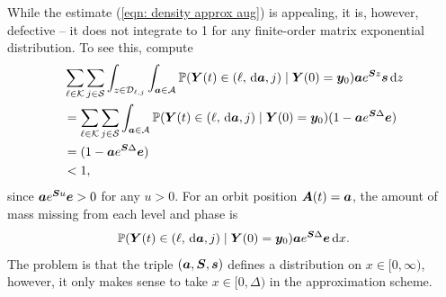 While the estimate (\ref{eqn: density approx aug}) is appealing, it is, however, defective -- it does not integrate to 1 for any finite-order matrix exponential distribution. To see this, compute 
\begin{align*}
	&\sum_{\ell\in\mathcal K}\sum_{j\in\mathcal S}\int_{z\in\mathcal D_{\ell,j}}\displaystyle\int_{\boldsymbol a \in\mathcal A}\mathbb P(\boldsymbol Y(t) \in{}(\ell, \, \mathrm{d} \boldsymbol a, j)\mid \boldsymbol Y(0)=\boldsymbol y_0) \boldsymbol a e^{ \boldsymbol{S}z} \boldsymbol s \, \mathrm{d} z
	\\&= \sum_{\ell\in\mathcal K}\sum_{j\in\mathcal S}\displaystyle\int_{\boldsymbol a \in\mathcal A}\mathbb P(\boldsymbol Y(t) \in{}(\ell, \, \mathrm{d} \boldsymbol a, j)\mid \boldsymbol Y(0)=\boldsymbol y_0) (1-\boldsymbol a e^{ \boldsymbol{S}\Delta}\boldsymbol e  )
	\\&=(1-\boldsymbol a e^{ \boldsymbol{S}\Delta}\boldsymbol e  )
	\\&<1,
\end{align*}
since \(\boldsymbol a e^{\boldsymbol{S}u} \boldsymbol e>0\) for any \(u>0\). For an orbit position \(\boldsymbol A(t)=\boldsymbol a\), the amount of mass missing from each level and phase is 
\[\mathbb P(\boldsymbol Y(t)\in{}(\ell, \, \mathrm{d} \boldsymbol a,j)\mid \boldsymbol Y(0)=\boldsymbol y_0) \boldsymbol a e^{\boldsymbol{S}\Delta} \boldsymbol e \, \mathrm{d} x.\]
The problem is that the triple \((\boldsymbol a,\boldsymbol S, \boldsymbol s)\) defines a distribution on \(x\in{}[0,\infty)\), however, it only makes sense to take \(x\in{}[0,\Delta)\) in the approximation scheme.

